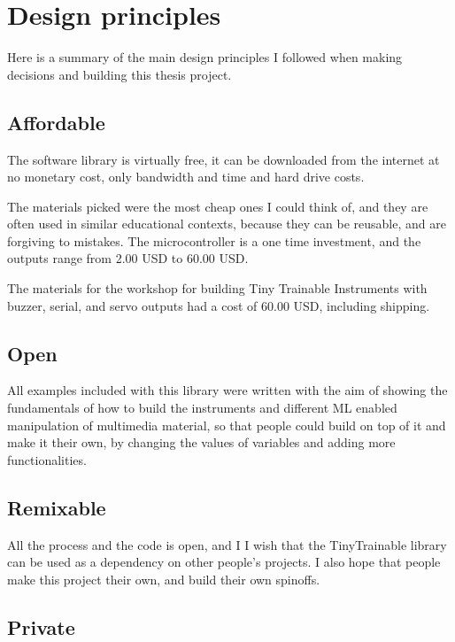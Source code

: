 \section{Design principles}

Here is a summary of the main design principles I followed when making decisions and building this thesis project.

\subsection{Affordable}

The software library is virtually free, it can be downloaded from the internet at no monetary cost, only bandwidth and time and hard drive costs.

The materials picked were the most cheap ones I could think of, and they are often used in similar educational contexts, because they can be reusable, and are forgiving to mistakes. The microcontroller is a one time investment, and the outputs range from 2.00 USD to 60.00 USD. 

The materials for the workshop for building Tiny Trainable Instruments with buzzer, serial, and servo outputs had a cost of 60.00 USD, including shipping.

\subsection{Open}

All examples included with this library were written with the aim of showing the fundamentals of how to build the instruments and different \acrshort{ML} enabled manipulation of multimedia material, so that people could build on top of it and make it their own, by changing the values of variables and adding more functionalities.

\subsection{Remixable}

All the process and the code is open, and I I wish that the TinyTrainable library can be used as a dependency on other people's projects. I also hope that people make this project their own, and build their own spinoffs. 

\subsection{Private}

